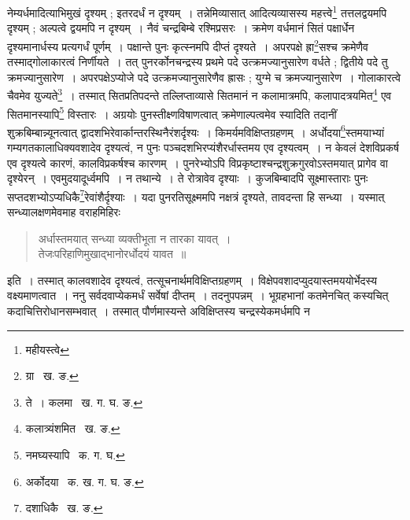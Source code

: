 \documentclass[11pt, openany]{book}
\begin{document}
\newpage

\noindent नेम्यर्धमादित्याभिमुखं दृश्यम् ; इतरदर्धं न दृश्यम्~। तन्नेमिव्यासात् आदित्यव्यासस्य महत्त्वे\renewcommand{\thefootnote}{१}\footnote{महीयस्त्वे} तत्तलद्वयमपि दृश्यम् ; अल्पत्वे द्वयमपि न दृश्यम्~। नैवं चन्द्रबिम्बे रश्मिप्रसरः~। क्रमेण वर्धमानं सितं पक्षार्धेन दृश्यमानार्धस्य प्रत्यगर्धं पूर्णम्~। पक्षान्ते पुनः कृत्स्नमपि दीप्तं दृश्यते~। अपरपक्षे 
ह्रा\renewcommand{\thefootnote}{२}\footnote{ग्रा \textendash\ ख. ङ.}सश्च क्रमेणैव तस्माद्गोलाकारत्वं निर्णीयते~। तत् पुनरर्कोनचन्द्रस्य प्रथमे पदे उत्क्रमज्यानुसारेण वर्धते ; द्वितीये पदे तु क्रमज्यानुसारेण~। अपरपक्षेऽप्योजे पदे उत्क्रमज्यानुसारेणैव ह्रासः ; युग्मे च क्रमज्यानुसारेण~। गोलाकारत्वे चैवमेव युज्यते\renewcommand{\thefootnote}{३}\footnote{ते~। कलमा \textendash\ ख. ग. घ. ङ.}~। तस्मात् सितप्रतिपदन्ते तल्लिप्ताव्यासे सितमानं न कलामात्रमपि, कलापादत्रयमित\renewcommand{\thefootnote}{४}\footnote{कलात्र्यंशमित \textendash\ ख. ङ.} एव 
सितमानस्यापि\renewcommand{\thefootnote}{५}\footnote{नमघ्यस्यापि \textendash\ क. ग. घ.} विस्तारः~। अग्रयोः पुनस्तीक्ष्णविषाणत्वात् क्रमेणाल्पत्वमेव स्यादिति तदानीं शुक्रबिम्बान्न्यूनत्वात् द्वादशभिरेवार्कान्तरस्थिनैरंशर्दृश्यः~। किमर्यमविक्षिप्तग्रहणम्~। अर्धोदया\renewcommand{\thefootnote}{६}\footnote{अर्कोदया \textendash\ क. ख. ग. घ. ङ.}स्तमयाभ्यां गम्यगतकालाधिक्यवशादेव दृश्यत्वं, न पुनः पञ्चदशभिरप्यंशैरर्धास्तमय एव दृश्यत्वम्~। न केवलं देशविप्रकर्ष एव दृश्यत्वे कारणं, कालविप्रकर्षश्च कारणम्~। पुनरेभ्योऽपि विप्रकृष्टाश्चन्द्रशुक्रगुरवोऽस्तमयात् प्रागेव वा दृश्येरन्~। एवमुदयादूर्ध्वमपि~। न तथान्ये~। ते रोत्रावेव दृश्याः~। कुजबिम्बादपि सूक्ष्मास्ताराः पुनः सप्तदशभ्योऽप्यधिकै\renewcommand{\thefootnote}{७}\footnote{दशाधिकै \textendash\ ख. ङ.}रेवांशैर्दृश्याः~। यदा पुनरतिसूक्ष्ममपि नक्षत्रं दृश्यते, तावदन्ता हि सन्ध्या~। यस्मात् सन्ध्यालक्षणमेवमाह वराहमिहिरः\textendash\ 
 
\begin{quote}
{\qt अर्धास्तमयात् सन्ध्या व्यक्तीभूता न तारका यावत्~। \\ 
 तेजःपरिहाणिमुखाद्भानोरर्धोदयं यावत~॥} 
\end{quote}

\noindent इति~। तस्मात् कालवशादेव दृश्यत्वं, तत्सूचनार्थमविक्षिप्तग्रहणम्~। विक्षेपवशादप्युदयास्तमययोर्भेदस्य वक्ष्यमाणत्वात~। ननु सर्वदवाप्येकमर्धं सर्वेषां दीप्तम्~। तदनुपपन्नम्~। भूग्रहभानां कतमेनचित् कस्यचित् कदाचित्तिरोधानसम्भवात्~। तस्मात् पौर्णमास्यन्ते अविक्षिप्तस्य चन्द्रस्येकमर्धमपि न

\newpage
\end{document}
